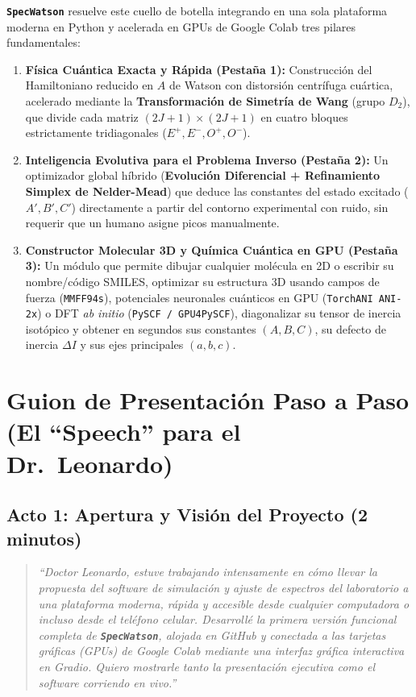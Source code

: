 \documentclass[11pt,letterpaper]{article}
\begin{document}
\textbf{\texttt{SpecWatson}} resuelve este cuello de botella integrando en una sola plataforma moderna en Python y acelerada en GPUs de Google Colab tres pilares fundamentales:
\begin{enumerate}[leftmargin=1.5em,itemsep=3pt]
    \item \textbf{Física Cuántica Exacta y Rápida (Pestaña 1):} Construcción del Hamiltoniano reducido en $A$ de Watson con distorsión centrífuga cuártica, acelerado mediante la \textbf{Transformación de Simetría de Wang} (grupo $D_2$), que divide cada matriz $(2J+1)\times(2J+1)$ en cuatro bloques estrictamente tridiagonales ($E^+, E^-, O^+, O^-$).
    \item \textbf{Inteligencia Evolutiva para el Problema Inverso (Pestaña 2):} Un optimizador global híbrido (\textbf{Evolución Diferencial + Refinamiento Simplex de Nelder-Mead}) que deduce las constantes del estado excitado ($A', B', C'$) directamente a partir del contorno experimental con ruido, sin requerir que un humano asigne picos manualmente.
    \item \textbf{Constructor Molecular 3D y Química Cuántica en GPU (Pestaña 3):} Un módulo que permite dibujar cualquier molécula en 2D o escribir su nombre/código SMILES, optimizar su estructura 3D usando campos de fuerza (\texttt{MMFF94s}), potenciales neuronales cuánticos en GPU (\texttt{TorchANI ANI-2x}) o DFT \textit{ab initio} (\texttt{PySCF / GPU4PySCF}), diagonalizar su tensor de inercia isotópico y obtener en segundos sus constantes $(A, B, C)$, su defecto de inercia $\Delta I$ y sus ejes principales $(a, b, c)$.
\end{enumerate}

\section{Guion de Presentación Paso a Paso (El ``Speech'' para el Dr.\ Leonardo)}

\subsection{Acto 1: Apertura y Visión del Proyecto (2 minutos)}
\begin{quote}
\textit{``Doctor Leonardo, estuve trabajando intensamente en cómo llevar la propuesta del software de simulación y ajuste de espectros del laboratorio a una plataforma moderna, rápida y accesible desde cualquier computadora o incluso desde el teléfono celular. Desarrollé la primera versión funcional completa de \textbf{\texttt{SpecWatson}}, alojada en GitHub y conectada a las tarjetas gráficas (GPUs) de Google Colab mediante una interfaz gráfica interactiva en Gradio. Quiero mostrarle tanto la presentación ejecutiva como el software corriendo en vivo.''}
\end{quote}
\end{document}
